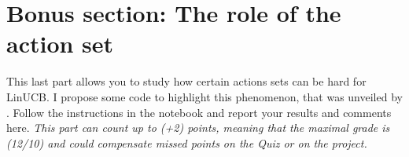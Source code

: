 
\newpage





\appendix

\section{Bonus section: The role of the action set}

This last part allows you to study how certain actions sets can be hard for LinUCB. I propose some code to highlight this phenomenon, that was unveiled by \citet{lattimore2017end}. 
Follow the instructions in the notebook and report your results and comments here. 
\emph{This part can count up to (+2) points, meaning that the maximal grade is (12/10) and could compensate missed points on the Quiz or on the project. }


